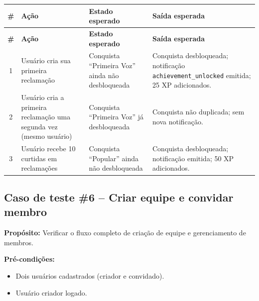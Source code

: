 \begin{longtable}{|c|p{4cm}|p{3.5cm}|p{4.5cm}|}
  \hline
  \textbf{\#} & \textbf{Ação} & \textbf{Estado esperado} & \textbf{Saída esperada} \\
  \hline
  \endfirsthead
  \hline
  \textbf{\#} & \textbf{Ação} & \textbf{Estado esperado} & \textbf{Saída esperada} \\
  \hline
  \endhead
  1 & Usuário cria sua primeira reclamação & Conquista ``Primeira Voz'' ainda não desbloqueada & Conquista desbloqueada; notificação \texttt{achievement\_unlocked} emitida; 25 XP adicionados. \\
  \hline
  2 & Usuário cria a primeira reclamação uma segunda vez (mesmo usuário) & Conquista ``Primeira Voz'' já desbloqueada & Conquista não duplicada; sem nova notificação. \\
  \hline
  3 & Usuário recebe 10 curtidas em reclamações & Conquista ``Popular'' ainda não desbloqueada & Conquista desbloqueada; notificação emitida; 50 XP adicionados. \\
  \hline
\end{longtable}

\subsection*{Caso de teste \#6 – Criar equipe e convidar membro}

\textbf{Propósito:} Verificar o fluxo completo de criação de equipe e gerenciamento de membros.

\textbf{Pré-condições:}
\begin{itemize}
  \item Dois usuários cadastrados (criador e convidado).
  \item Usuário criador logado.
\end{itemize}

